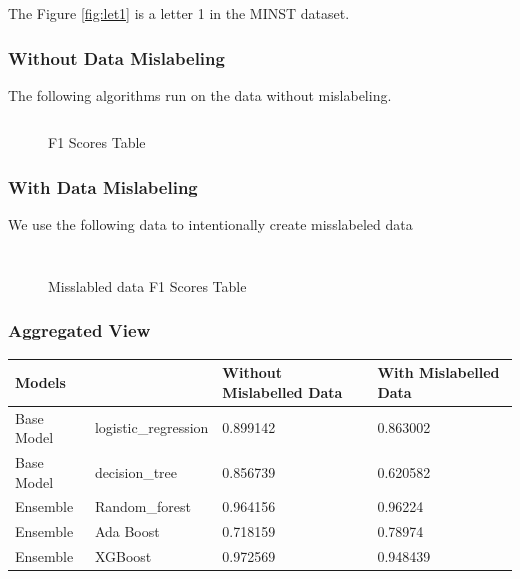\documentclass{article}
\begin{document}
The Figure \ref{fig:let1} is a letter 1 in the MINST dataset. 

\subsubsection{Without Data Mislabeling}

The following algorithms run on the data without mislabeling. 

\inputminted[firstline=30,lastline=77,frame=single,framesep=10pt,fontsize=\footnotesize]{python}{minst/main.py}

\begin{figure}[H]
    \centering
    
    \caption{F1 Scores Table}
\end{figure}


\subsubsection{With Data Mislabeling}

We use the following data to intentionally create misslabeled data

\inputminted[frame=single,framesep=10pt,fontsize=\footnotesize]{python}{minst/do_miss_label.py}


\inputminted[firstline=93,lastline=142,frame=single,framesep=10pt,fontsize=\footnotesize]{python}{minst/main.py}


\begin{figure}[H]
    \centering
    
    \caption{Misslabled data F1 Scores Table}
\end{figure}

\subsubsection{Aggregated View}


\begin{table}[H]
    \begin{tabular}{|l|l|l|l|}
    \hline
    \multicolumn{2}{|l|}{Models}      & Without Mislabelled Data & With Mislabelled Data \\ \hline
    Base Model & logistic\_regression & 0.899142                 & 0.863002              \\ \hline
    Base Model & decision\_tree       & 0.856739                 & 0.620582              \\ \hline
    Ensemble   & Random\_forest       & 0.964156                 & 0.96224               \\ \hline
    Ensemble   & Ada Boost            & 0.718159                 & 0.78974               \\ \hline
    Ensemble   & XGBoost              & 0.972569                 & 0.948439              \\ \hline
    \end{tabular}
\end{table}
\end{document}

